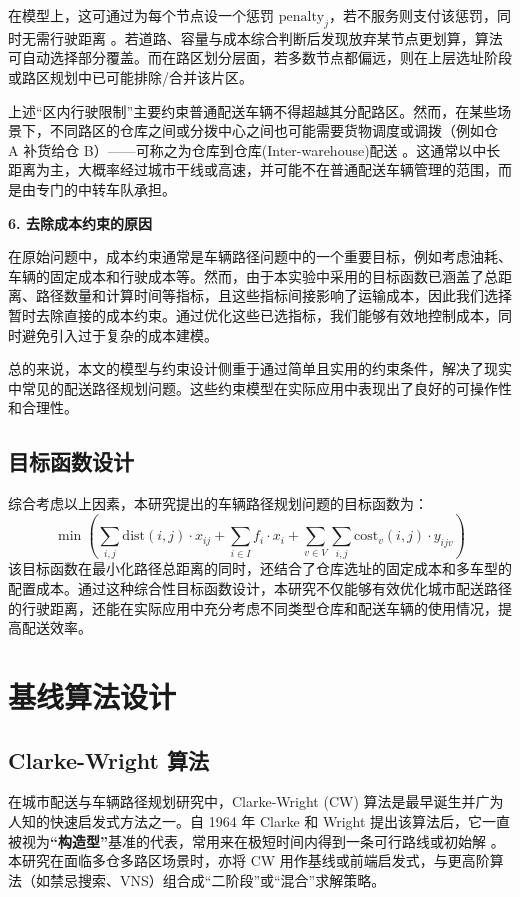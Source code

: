 \documentclass[12pt,a4paper,twoside]{ctexbook}
\begin{document}
在模型上，这可通过为每个节点设一个惩罚 $\mathrm{penalty}_j$，若不服务则支付该惩罚，同时无需行驶距离 \cite{salazaraguilar2013multi}。若道路、容量与成本综合判断后发现放弃某节点更划算，算法可自动选择部分覆盖。而在路区划分层面，若多数节点都偏远，则在上层选址阶段或路区规划中已可能排除/合并该片区。

上述“区内行驶限制”主要约束普通配送车辆不得超越其分配路区。然而，在某些场景下，不同路区的仓库之间或分拨中心之间也可能需要货物调度或调拨（例如仓 A 补货给仓 B）——可称之为仓库到仓库(Inter-warehouse)配送 \cite{cordeau1997tabu}。这通常以中长距离为主，大概率经过城市干线或高速，并可能不在普通配送车辆管理的范围，而是由专门的中转车队承担。

\textbf{6. 去除成本约束的原因}

在原始问题中，成本约束通常是车辆路径问题中的一个重要目标，例如考虑油耗、车辆的固定成本和行驶成本等。然而，由于本实验中采用的目标函数已涵盖了总距离、路径数量和计算时间等指标，且这些指标间接影响了运输成本，因此我们选择暂时去除直接的成本约束。通过优化这些已选指标，我们能够有效地控制成本，同时避免引入过于复杂的成本建模。

总的来说，本文的模型与约束设计侧重于通过简单且实用的约束条件，解决了现实中常见的配送路径规划问题。这些约束模型在实际应用中表现出了良好的可操作性和合理性。

\subsection{目标函数设计}
综合考虑以上因素，本研究提出的车辆路径规划问题的目标函数为：
\[
\min \left( \sum_{i,j} \text{dist}(i,j) \cdot x_{ij} + \sum_{i \in I} f_i \cdot x_i + \sum_{v \in V} \sum_{i,j} \text{cost}_v(i,j) \cdot y_{ijv} \right)
\]
该目标函数在最小化路径总距离的同时，还结合了仓库选址的固定成本和多车型的配置成本。通过这种综合性目标函数设计，本研究不仅能够有效优化城市配送路径的行驶距离，还能在实际应用中充分考虑不同类型仓库和配送车辆的使用情况，提高配送效率。

\section{基线算法设计}

\subsection{Clarke-Wright 算法}

在城市配送与车辆路径规划研究中，Clarke-Wright (CW) 算法是最早诞生并广为人知的快速启发式方法之一。自 1964 年 Clarke 和 Wright 提出该算法后，它一直被视为\textbf{“构造型”}基准的代表，常用来在极短时间内得到一条可行路线或初始解 \cite{clarke1964scheduling}。本研究在面临多仓多路区场景时，亦将 CW 用作基线或前端启发式，与更高阶算法（如禁忌搜索、VNS）组合成“二阶段”或“混合”求解策略。
\end{document}
